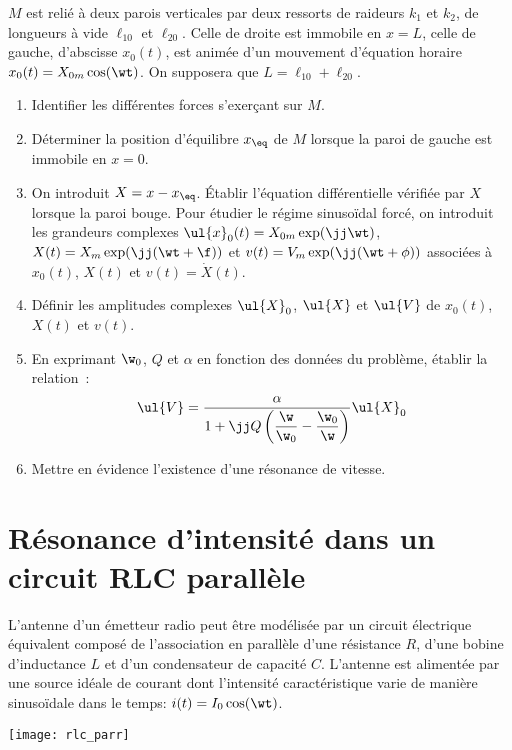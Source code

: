 \documentclass[a4paper, 12pt, final, garamond]{book}
\begin{document}
$M$ est relié à deux parois verticales par deux ressorts de raideurs $k_1$
et $k_2$, de longueurs à vide $\ell_{10}$ et $\ell_{20}$. Celle de droite est
immobile en $x = L$, celle de gauche, d'abscisse $x_0 (t)$, est animée d'un
mouvement d'équation horaire $x_0 (t) = X_{0m} \cos(\wt)$. On supposera
que $L = \ell_{10} + \ell_{20}$.

\begin{enumerate}
    \item Identifier les différentes forces s'exerçant sur $M$.
    \item Déterminer la position d'équilibre $x_{\eq}$ de $M$ lorsque la paroi
        de gauche est immobile en $x = 0$.
    \item On introduit $X = x - x_{\eq}$. Établir l'équation différentielle
        vérifiée par $X$ lorsque la paroi bouge. Pour étudier le régime
        sinusoïdal forcé, on introduit les grandeurs complexes $\ul{x}_0(t) =
        X_{0m} \exp(\jj\wt)$, $X(t) = X_m
        \exp(\jj(\wt + \f))$ et $v(t) = V_m \exp(\jj(\wt +
        \phi))$ associées à $x_0(t)$, $X(t)$ et $v(t) = \dot X(t)$.
    \item Définir les amplitudes complexes $\ul{X}_0$, $\ul{X}$ et $\ul{V}$ de
        $x_0(t)$, $X(t)$ et $v(t)$.
    \item En exprimant $\w_0$, $Q$ et $\alpha$ en fonction des données du
        problème, établir la relation~: \[\ul{V} = \dfrac{\alpha}{1 +
        \jj Q\left(\dfrac{\w}{\w_0} - \dfrac{\w_0}{\w}\right)} \ul{X}_0\]
    \item Mettre en évidence l'existence d'une résonance de vitesse.
\end{enumerate}

\section{Résonance d'intensité dans un circuit RLC parallèle}

\begin{minipage}{0.60\linewidth}
    L'antenne d'un émetteur radio peut être modélisée par un circuit électrique
    équivalent composé de l'association en parallèle d'une résistance $R$,
    d'une bobine d'inductance $L$ et d'un condensateur de capacité $C$.
    \smallbreak
    L'antenne est alimentée par une source idéale de courant dont l'intensité
    caractéristique varie de manière sinusoïdale dans le temps: $i(t) = I_0
    \cos(\wt)$.
\end{minipage}
\hfill
\begin{minipage}{0.35\linewidth}
    \begin{center}
        \texttt{[image: rlc\_parr]}
    \end{center}
\end{minipage}
\end{document}

